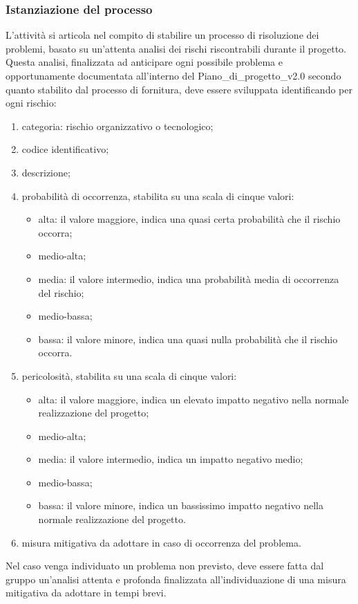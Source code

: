 \subsubsection{Istanziazione del processo}
L'attività si articola nel compito di stabilire un processo di risoluzione dei problemi, basato su un'attenta analisi dei rischi riscontrabili durante il progetto. Questa analisi, finalizzata ad anticipare ogni possibile problema e opportunamente documentata all'interno del Piano\_di\_progetto\_v2.0 secondo quanto stabilito dal processo di fornitura, deve essere sviluppata identificando per ogni rischio:
\begin{enumerate}
    \item categoria: rischio organizzativo o tecnologico;
    \item codice identificativo;
    \item descrizione;
    \item probabilità di occorrenza, stabilita su una scala di cinque valori:
    \begin{itemize}
        \item alta: il valore maggiore, indica una quasi certa probabilità che il rischio occorra;
        \item medio-alta;
        \item media: il valore intermedio, indica una probabilità media di occorrenza del rischio;
        \item medio-bassa;
        \item bassa: il valore minore, indica una quasi nulla probabilità che il rischio occorra.
    \end{itemize}
    \item pericolosità, stabilita su una scala di cinque valori:
    \begin{itemize}
        \item alta: il valore maggiore, indica un elevato impatto negativo nella normale realizzazione del progetto;
        \item medio-alta;
        \item media: il valore intermedio, indica un impatto negativo medio;
        \item medio-bassa;
        \item bassa: il valore minore, indica un bassissimo impatto negativo nella normale realizzazione del progetto.
    \end{itemize}
    \item misura mitigativa da adottare in caso di occorrenza del problema.
\end{enumerate}
Nel caso venga individuato un problema non previsto, deve essere fatta dal gruppo un'analisi attenta e profonda finalizzata all'individuazione di una misura mitigativa da adottare in tempi brevi.
